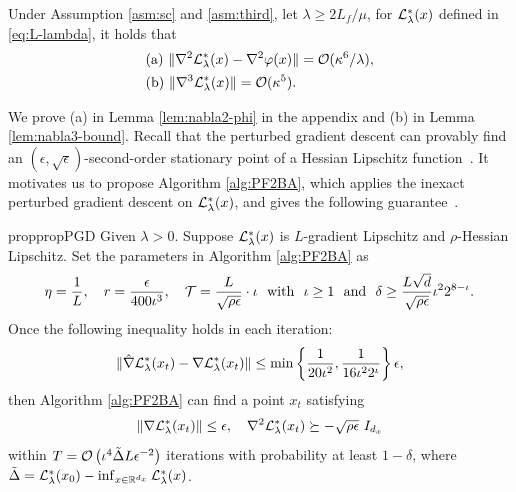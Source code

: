 \documentclass{article}
\begin{document}
\begin{lem} \label{lem:2rd}
    Under Assumption \ref{asm:sc} and \ref{asm:third}, let $\lambda  \ge  2L_f /\mu$, for ${\mathcal{L}}_{\lambda}^*(x)$ defined in \eqref{eq:L-lambda}, it holds that
\begin{align*}
    &{\rm (a)}~ \Vert \nabla^2 {\mathcal{L}}_{\lambda}^*(x) - \nabla^2 \varphi(x) \Vert = {\mathcal{O}}(\kappa^6 /\lambda),\\
    & {\rm (b)}~ \Vert \nabla^3 {\mathcal{L}}_{\lambda}^*(x) \Vert = {\mathcal{O}}(\kappa^5).
\end{align*}
\end{lem}
We prove (a) in Lemma \ref{lem:nabla2-phi} in the appendix and (b) in Lemma \ref{lem:nabla3-bound}. Recall that the perturbed gradient descent can provably find an $(\epsilon,\sqrt{\epsilon})$-second-order stationary point of a  Hessian Lipschitz function~\cite{jin2017escape}.
It
motivates us to propose Algorithm \ref{alg:PF2BA}, which applies 
the inexact perturbed gradient descent on ${\mathcal{L}}_{\lambda}^*(x)$, and gives the following guarantee~\cite{huang2022efficiently}.

\begin{restatable}{prop}{propPGD} \label{prop:iPGD}
Given $\lambda >0$.
Suppose ${\mathcal{L}}_{\lambda}^*(x)$ is $L$-gradient Lipschitz and $\rho$-Hessian Lipschitz. Set the parameters in Algorithm \ref{alg:PF2BA} as 
\begin{align} \label{cond:iota}
    \eta = \frac{1}{L}, \quad r = \frac{\epsilon}{400 \iota^3}, \quad {\mathcal{T}} = \frac{L}{\sqrt{\rho \epsilon}} \cdot \iota ~~{\rm with }~~ \iota \ge 1 ~~ {\rm and} ~~ \delta \ge  \frac{L \sqrt{d}}{\sqrt{\rho \epsilon}} \iota^2 2^{8-\iota}.
\end{align}
Once the following inequality holds in each
iteration:
\begin{align} \label{cond:PF2BA}
    \Vert \hat \nabla {\mathcal{L}}_{\lambda}^*(x_t) - \nabla {\mathcal{L}}_{\lambda}^*(x_t) \Vert \le \min \left\{ 
    \frac{1}{20 \iota^2},  \frac{1}{16 \iota^2 2^{\iota}} \right\} \epsilon,
\end{align}
then Algorithm \ref{alg:PF2BA} can find a point $x_t$ satisfying
\begin{align*}
    \Vert \nabla {\mathcal{L}}_{\lambda}^*(x_t) \Vert \le \epsilon, \quad  \nabla^2 {\mathcal{L}}_{\lambda}^*(x_t)  \succeq - \sqrt{\rho \epsilon}~ I_{d_x}
\end{align*}
within $T= {\mathcal{O}} \left( {\iota^4 \tilde \Delta L}{\epsilon^{-2}}   \right)$ iterations with probability at least $1-\delta$, where
$\tilde \Delta = {\mathcal{L}}_{\lambda}^*(x_0) - \inf_{x \in {\mathbb{R}}^{d_x}} {\mathcal{L}}_{\lambda}^*(x)$.    
\end{restatable} 
\end{document}
